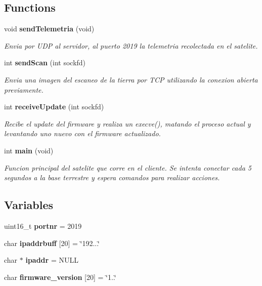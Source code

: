 \subsection*{Functions}
\begin{DoxyCompactItemize}
\item 
void \textbf{ send\+Telemetria} (void)
\begin{DoxyCompactList}\small\item\em Envia por U\+DP al servidor, al puerto 2019 la telemetria recolectada en el satelite. \end{DoxyCompactList}\item 
int \textbf{ send\+Scan} (int sockfd)
\begin{DoxyCompactList}\small\item\em Envia una imagen del escaneo de la tierra por T\+CP utilizando la conexion abierta previamente. \end{DoxyCompactList}\item 
int \textbf{ receive\+Update} (int sockfd)
\begin{DoxyCompactList}\small\item\em Recibe el update del firmware y realiza un execve(), matando el proceso actual y levantando uno nuevo con el firmware actualizado. \end{DoxyCompactList}\item 
int \textbf{ main} (void)
\begin{DoxyCompactList}\small\item\em Funcion principal del satelite que corre en el cliente. Se intenta conectar cada 5 segundos a la base terrestre y espera comandos para realizar acciones. \end{DoxyCompactList}\end{DoxyCompactItemize}
\subsection*{Variables}
\begin{DoxyCompactItemize}
\item 
uint16\+\_\+t \textbf{ portnr} = 2019
\item 
char \textbf{ ipaddrbuff} [20] = \char`\"{}192...\char`\"{}
\item 
char $\ast$ \textbf{ ipaddr} = N\+U\+LL
\item 
char \textbf{ firmware\+\_\+version} [20] = \char`\"{}1..\char`\"{}
\end{DoxyCompactItemize}


